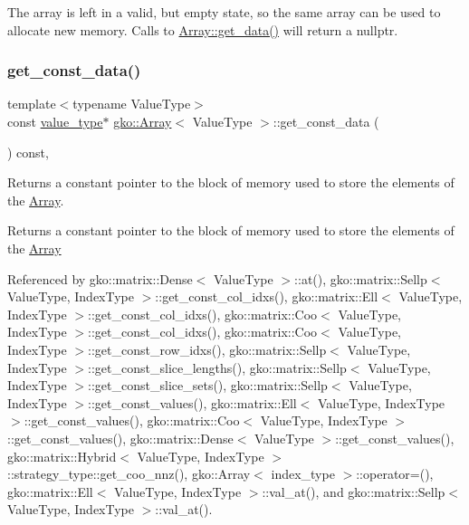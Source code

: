 The array is left in a valid, but empty state, so the same array can be used to allocate new memory. Calls to \hyperlink{classgko_1_1Array_a9acf29878703bb8767e3cea2ba499dae}{Array\+::get\+\_\+data()} will return a {\ttfamily nullptr}. \mbox{\label{classgko_1_1Array_a5a46e0920b649cdb062f5e415922d1aa}} 
\subsubsection{\texorpdfstring{get\+\_\+const\+\_\+data()}{get\_const\_data()}}
{\footnotesize\ttfamily template$<$typename Value\+Type$>$ \\
const \hyperlink{classgko_1_1Array_ad40c95e429262175cae51bcabd291a5b}{value\+\_\+type}$\ast$ \hyperlink{classgko_1_1Array}{gko\+::\+Array}$<$ Value\+Type $>$\+::get\+\_\+const\+\_\+data (\begin{DoxyParamCaption}{ }\end{DoxyParamCaption}) const\hspace{0.3cm}{\ttfamily [inline]}, {\ttfamily [noexcept]}}



Returns a constant pointer to the block of memory used to store the elements of the \hyperlink{classgko_1_1Array}{Array}. 

\begin{DoxyReturn}{Returns}
a constant pointer to the block of memory used to store the elements of the \hyperlink{classgko_1_1Array}{Array} 
\end{DoxyReturn}


Referenced by gko\+::matrix\+::\+Dense$<$ Value\+Type $>$\+::at(), gko\+::matrix\+::\+Sellp$<$ Value\+Type, Index\+Type $>$\+::get\+\_\+const\+\_\+col\+\_\+idxs(), gko\+::matrix\+::\+Ell$<$ Value\+Type, Index\+Type $>$\+::get\+\_\+const\+\_\+col\+\_\+idxs(), gko\+::matrix\+::\+Coo$<$ Value\+Type, Index\+Type $>$\+::get\+\_\+const\+\_\+col\+\_\+idxs(), gko\+::matrix\+::\+Coo$<$ Value\+Type, Index\+Type $>$\+::get\+\_\+const\+\_\+row\+\_\+idxs(), gko\+::matrix\+::\+Sellp$<$ Value\+Type, Index\+Type $>$\+::get\+\_\+const\+\_\+slice\+\_\+lengths(), gko\+::matrix\+::\+Sellp$<$ Value\+Type, Index\+Type $>$\+::get\+\_\+const\+\_\+slice\+\_\+sets(), gko\+::matrix\+::\+Sellp$<$ Value\+Type, Index\+Type $>$\+::get\+\_\+const\+\_\+values(), gko\+::matrix\+::\+Ell$<$ Value\+Type, Index\+Type $>$\+::get\+\_\+const\+\_\+values(), gko\+::matrix\+::\+Coo$<$ Value\+Type, Index\+Type $>$\+::get\+\_\+const\+\_\+values(), gko\+::matrix\+::\+Dense$<$ Value\+Type $>$\+::get\+\_\+const\+\_\+values(), gko\+::matrix\+::\+Hybrid$<$ Value\+Type, Index\+Type $>$\+::strategy\+\_\+type\+::get\+\_\+coo\+\_\+nnz(), gko\+::\+Array$<$ index\+\_\+type $>$\+::operator=(), gko\+::matrix\+::\+Ell$<$ Value\+Type, Index\+Type $>$\+::val\+\_\+at(), and gko\+::matrix\+::\+Sellp$<$ Value\+Type, Index\+Type $>$\+::val\+\_\+at().

